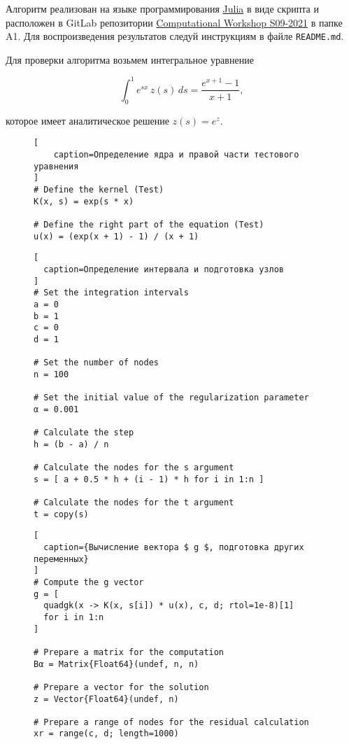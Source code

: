 Алгоритм реализован на языке программирования \href{https://julialang.org/}{Julia} в виде скрипта и расположен в GitLab репозитории \href{https://gitlab.com/paveloom-g/university/s09-2021/computational-workshop}{Computational Workshop S09-2021} в папке A1. Для воспроизведения результатов следуй инструкциям в файле {\footnotesize \texttt{README.md}}. \npar

Для проверки алгоритма возьмем интегральное уравнение

\begin{equation}
  \int_0^1 e^{sx} \, z(s) \, ds = \frac{e^{x+1} - 1}{x + 1},
\end{equation}

которое имеет аналитическое решение $ z(s) = e^z $.

\newpage

\captionsetup{singlelinecheck=false, justification=justified}

\begin{figure}[h!]
\begin{lstlisting}[
    caption=Определение ядра и правой части тестового уравнения
]
# Define the kernel (Test)
K(x, s) = exp(s * x)

# Define the right part of the equation (Test)
u(x) = (exp(x + 1) - 1) / (x + 1)
\end{lstlisting}
\end{figure}

\begin{figure}[h!]
\begin{lstlisting}[
  caption=Определение интервала и подготовка узлов
]
# Set the integration intervals
a = 0
b = 1
c = 0
d = 1

# Set the number of nodes
n = 100

# Set the initial value of the regularization parameter
α = 0.001

# Calculate the step
h = (b - a) / n

# Calculate the nodes for the s argument
s = [ a + 0.5 * h + (i - 1) * h for i in 1:n ]

# Calculate the nodes for the t argument
t = copy(s)
\end{lstlisting}
\end{figure}

\begin{figure}[h!]
\begin{lstlisting}[
  caption={Вычисление вектора $ g $, подготовка других переменных}
]
# Compute the g vector
g = [
  quadgk(x -> K(x, s[i]) * u(x), c, d; rtol=1e-8)[1]
  for i in 1:n
]

# Prepare a matrix for the computation
Bα = Matrix{Float64}(undef, n, n)

# Prepare a vector for the solution
z = Vector{Float64}(undef, n)

# Prepare a range of nodes for the residual calculation
xr = range(c, d; length=1000)
\end{lstlisting}
\end{figure}

